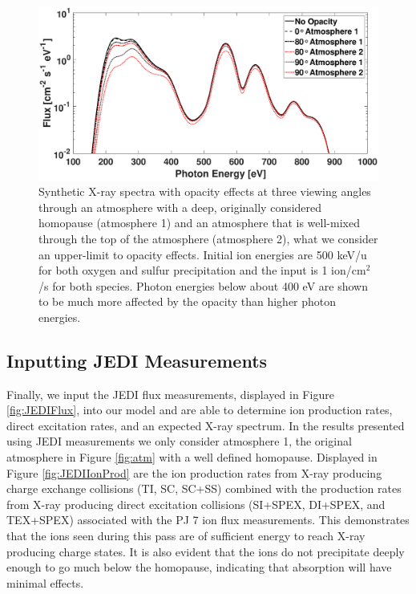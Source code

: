 \documentclass[draft]{agujournal2018}
\begin{document}
\begin{figure}[ht]
    \centering
    \includegraphics[width=\textwidth]{Figures/OpacityATM1ATM2.eps}
    \caption{Synthetic X-ray spectra with opacity effects at three viewing angles through an atmosphere with a deep, originally considered homopause (atmosphere 1) and an atmosphere that is well-mixed through the top of the atmosphere (atmosphere 2), what we consider an upper-limit to opacity effects. Initial ion energies are 500 keV/u for both oxygen and sulfur precipitation and the input is 1 ion/cm$^2$/s for both species. Photon energies below about 400 eV are shown to be much more affected by the opacity than higher photon energies.}
    \label{fig:XraySpecOpac}
\end{figure}

\subsection{Inputting JEDI Measurements}

Finally, we input the JEDI flux measurements, displayed in Figure \ref{fig:JEDIFlux}, into our model and are able to determine ion production rates, direct excitation rates, and an expected X-ray spectrum.
In the results presented using JEDI measurements we only consider atmosphere 1, the original atmosphere in Figure \ref{fig:atm} with a well defined homopause.
Displayed in Figure \ref{fig:JEDIIonProd} are the ion production rates from X-ray producing charge exchange collisions (TI, SC, SC+SS) combined with the production rates from X-ray producing direct excitation collisions (SI+SPEX, DI+SPEX, and TEX+SPEX) associated with the PJ 7 ion flux measurements.
This demonstrates that the ions seen during this pass are of sufficient energy to reach X-ray producing charge states.
It is also evident that the ions do not precipitate deeply enough to go much below the homopause, indicating that absorption will have minimal effects.
\end{document}
